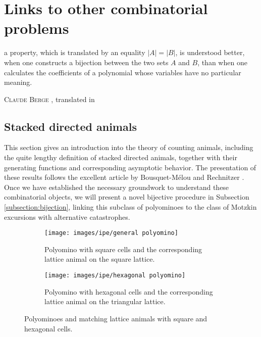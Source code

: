 \chapter{Links to other combinatorial problems}
\label{chapter:stacked_directed_animals}

\epigraph{\textelp{} a property, which is translated by an equality $|A| = |B|$, is understood better, when one constructs a bijection between the two sets $A$ and $B$, than when one calculates the coefficients of a polynomial whose variables have no particular meaning. 
}{\textsc{Claude Berge} \cite[p.~10]{Berge}, translated in \cite[p.~94]{AnalyticCombinatorics}}

\section{Stacked directed animals}

This section gives an introduction into the theory of counting animals, including the quite lengthy definition of stacked directed animals, together with their generating functions and corresponding asymptotic behavior. 
The presentation of these results follows the excellent article by Bousquet-Mélou and Rechnitzer \cite{LatticeAnimals}. 
Once we have established the necessary groundwork to understand these combinatorial objects, we will present a novel bijective procedure in Subsection \ref{subsection:bijection}, linking this subclass of polyominoes to the class of Motzkin excursions with alternative catastrophes.

\begin{figure}[hbt!]
  \centering
  \begin{subfigure}{0.45\textwidth}
    \centering
    \texttt{[image: images/ipe/general polyomino]}
    \caption{Polyomino with square cells and the corresponding lattice animal on the square lattice.}
  \end{subfigure}
  \hfill
  \begin{subfigure}{0.45\textwidth}
    \centering
    \texttt{[image: images/ipe/hexagonal polyomino]}
    \caption{Polyomino with hexagonal cells and the corresponding lattice animal on the triangular lattice.}
  \end{subfigure}
  \caption[Polyominoes and matching lattice animals.]{Polyominoes and matching lattice animals with square and hexagonal cells.}
  \label{fig:lattice_animals}
\end{figure}

